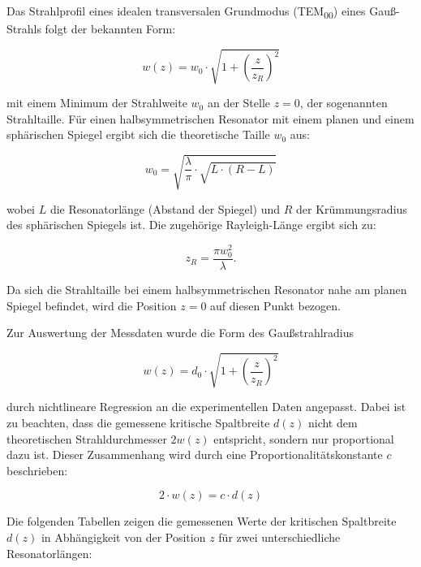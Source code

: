 Das Strahlprofil eines idealen transversalen Grundmodus (TEM\textsubscript{00}) eines Gauß-Strahls folgt der bekannten Form:

\begin{equation*}
    w(z) = w_0 \cdot \sqrt{1+\left(\frac{z}{z_R}\right)^2}
\end{equation*}
 
mit einem Minimum der Strahlweite \( w_0 \) an der Stelle \( z = 0 \), der sogenannten Strahltaille. Für einen halbsymmetrischen Resonator mit einem planen und einem sphärischen Spiegel ergibt sich die theoretische Taille \( w_0 \) aus:

\begin{equation*}
    w_0 = \sqrt{\frac{\lambda}{\pi} \cdot \sqrt{L \cdot (R - L)}}
\end{equation*}

wobei \( L \) die Resonatorlänge (Abstand der Spiegel) und \( R \) der Krümmungsradius des sphärischen Spiegels ist. Die zugehörige Rayleigh-Länge ergibt sich zu:

\begin{equation*}
    z_R = \frac{\pi w_0^2}{\lambda}.
\end{equation*}

Da sich die Strahltaille bei einem halbsymmetrischen Resonator nahe am planen Spiegel befindet, wird die Position \( z = 0 \) auf diesen Punkt bezogen.

Zur Auswertung der Messdaten wurde die Form des Gaußstrahlradius

\begin{equation*}
    w(z) = d_0 \cdot \sqrt{1+\left(\frac{z}{z_R}\right)^2}
\end{equation*}

durch nichtlineare Regression an die experimentellen Daten angepasst. 
Dabei ist zu beachten, dass die gemessene kritische Spaltbreite \( d(z) \) nicht dem theoretischen Strahldurchmesser \( 2w(z) \) entspricht, sondern nur proportional dazu ist. Dieser Zusammenhang wird durch eine Proportionalitätskonstante \( c \) beschrieben:

\begin{equation}
    2 \cdot w(z) = c \cdot d(z)
    \label{eq:proportionalitaet}
\end{equation}

Die folgenden Tabellen zeigen die gemessenen Werte der kritischen Spaltbreite \( d(z) \) in Abhängigkeit von der Position \( z \) für zwei unterschiedliche Resonatorlängen:

